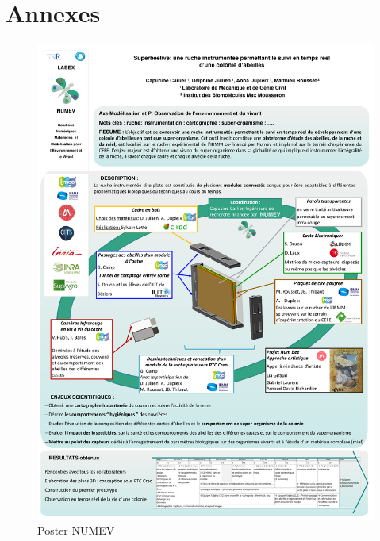 \documentclass[11pt,french,a4paper]{report}
\begin{document}



\chapter{Annexes}
\begin{figure}[t]
    \centering
    \includegraphics[scale=0.2]{../images/annexes/poster_numev.pdf}
    \caption{Poster NUMEV}
    \label{an1}
\end{figure}
\end{document}
